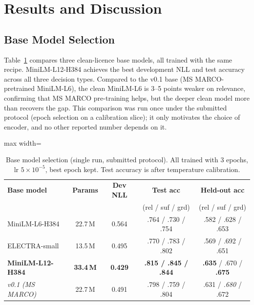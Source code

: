 \documentclass[twocolumn]{ICCKjournal}
\begin{document}
\section{Results and Discussion}
\label{sec:results}

\subsection{Base Model Selection}
\label{sec:baseselection}
Table~\ref{tab:baseselection} compares three clean-licence base models, all trained with the same recipe. MiniLM-L12-H384 achieves the best development NLL and test accuracy across all three decision types. Compared to the v0.1 base (MS MARCO-pretrained MiniLM-L6), the clean MiniLM-L6 is 3--5 points weaker on relevance, confirming that MS MARCO pre-training helps, but the deeper clean model more than recovers the gap. This comparison was run once under the submitted protocol (epoch selection on a calibration slice); it only motivates the choice of encoder, and no other reported number depends on it.

\begin{table}[H]
\caption{Base model selection (single run, submitted protocol). All trained with 3 epochs, lr $5\!\times\!10^{-5}$, best epoch kept. Test accuracy is after temperature calibration.}
\label{tab:baseselection}
\centering
\small
\begin{adjustbox}{max width=\linewidth}
\begin{tabular}{lcccc}
\toprule
\textbf{Base model} & \textbf{Params} & \textbf{Dev NLL} & \textbf{Test acc} & \textbf{Held-out acc} \\
 & & & (rel / suf / grd) & (rel / suf / grd) \\
\midrule
MiniLM-L6-H384 & 22.7\,M & 0.564 & .764 / .730 / .754 & .582 / .628 / .653 \\
ELECTRA-small & 13.5\,M & 0.495 & .770 / .783 / .802 & .569 / .692 / .651 \\
\textbf{MiniLM-L12-H384} & \textbf{33.4\,M} & \textbf{0.429} & \textbf{.815 / .845 / .844} & \textbf{.635} / .670 / \textbf{.675} \\
\midrule
\textit{v0.1 (MS MARCO)} & 22.7\,M & 0.491 & .798 / .759 / .804 & .631 / \textit{.680} / .672 \\
\bottomrule
\end{tabular}
\end{adjustbox}
\end{table}
\end{document}

